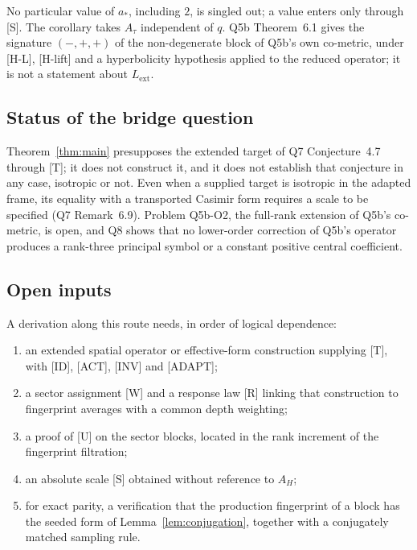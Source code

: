 \documentclass[12pt,a4paper]{article}
\theoremstyle{definition}
\theoremstyle{remark}
\begin{document}
      No particular value of $a_*$, including $2$, is singled out; a value enters only through [S].
      The corollary takes $A_\tau$ independent of $q$.
      Q5b Theorem~6.1 gives the signature $(-,+,+)$ of the non-degenerate block of Q5b's own co-metric, under
      [H-L], [H-lift] and a hyperbolicity hypothesis applied to the reduced operator; it is not a statement about
      $L_{\mathrm{ext}}$.

    \subsection{Status of the bridge question}

      Theorem~\ref{thm:main} presupposes the extended target of Q7 Conjecture~4.7 through [T]; it does not construct
      it, and it does not establish that conjecture in any case, isotropic or not.
      Even when a supplied target is isotropic in the adapted frame, its equality with a transported Casimir form
      requires a scale to be specified (Q7 Remark~6.9).
      Problem Q5b-O2, the full-rank extension of Q5b's co-metric, is open, and Q8 shows that no lower-order
      correction of Q5b's operator produces a rank-three principal
      symbol or a constant positive central coefficient.

    \subsection{Open inputs}

      A derivation along this route needs, in order of logical dependence:
      \begin{enumerate}
        \item an extended spatial operator or effective-form construction supplying [T], with [ID], [ACT], [INV] and
        [ADAPT];
        \item a sector assignment [W] and a response law [R] linking that construction to fingerprint averages with a
        common depth weighting;
        \item a proof of [U] on the sector blocks, located in the rank increment of the fingerprint filtration;
        \item an absolute scale [S] obtained without reference to $A_H$;
        \item for exact parity, a verification that the production fingerprint of a block has the seeded form of
        Lemma~\ref{lem:conjugation}, together with a conjugately matched sampling rule.
      \end{enumerate}
\end{document}
